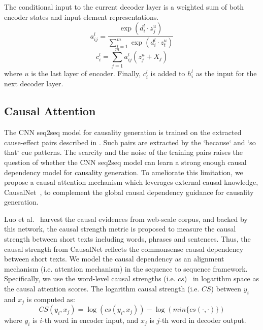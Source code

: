 The conditional input to the current 
decoder layer is a weighted sum of both encoder states and input element representations.
\begin{equation}\label{eq:a}
a _ { i j } ^ { l } = \frac { \exp \left( d _ { i } ^ { l } \cdot z _ { j } ^ { u } \right) } { \sum _ { t = 1 } ^ { m } \exp \left( d _ { i } ^ { l } \cdot z _ { t } ^ { u } \right) }
\end{equation}
\begin{equation}\label{eq:c}
c _ { i } ^ { l } = \sum _ { j = 1 } ^ { m } a _ { i j } ^ { l } \left( z _ { j } ^ { u } + X_j \right)
\end{equation}
where $u$ is the last layer of encoder.  
Finally, $c _ { i } ^ { l }$ is added to $h_{i}^{l}$ as the input for the next decoder layer.


\subsection{Causal Attention}
\label{sec:causal_attention}
The CNN seq2seq model for causality generation is trained
on the extracted cause-effect pairs described in . 
Such pairs are extracted by the `because` and `so that` cue patterns. 
The scarcity and the noise of the training pairs raises the
question of whether the CNN seq2seq model can learn a strong enough causal dependency model for causality generation.
To ameliorate this limitation, we propose a causal attention 
mechanism which leverages external causal knowledge, CausalNet~\cite{LuoSZHW16}, to complement the global causal dependency guidance for causality generation.

Luo et al.~\cite{LuoSZHW16} harvest the causal evidences from web-scale corpus, and backed by this network, the causal strength metric is proposed to measure the causal
strength between short texts including words, phrases and sentences. 
Thus, the causal strength from CausalNet reflects the commonsense causal dependency between short texts.
We model the causal dependency as an alignment
mechanism (i.e. attention mechanism) in the sequence to sequence framework.
Specifically, we use the word-level causal strengths (i.e. $cs$)~\cite{LuoSZHW16} in logarithm space as the causal attention scores.
The logarithm causal strength (i.e. $CS$) between $y_i$ and $x_j$ is computed as:
\begin{equation}\label{eq:acs}
CS(y_i, x_j) = \log\left(cs(y_i,x_j)\right) - \log\left(min\{cs(\cdot, \cdot)\}\right)
\end{equation}
where $y_i$ is $i$-th word in encoder input, 
and $x_j$ is $j$-th word in decoder output.

